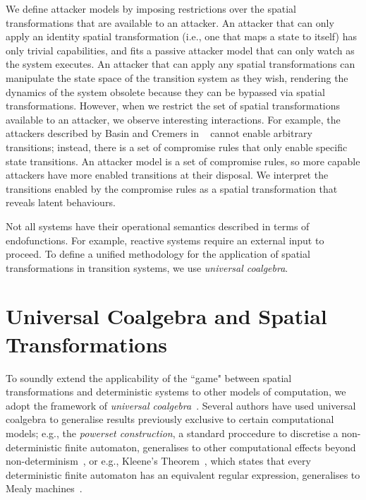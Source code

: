 We define attacker models by imposing restrictions over the spatial transformations that are available to an attacker. An attacker that can only apply an identity spatial transformation (i.e., one that maps a state to itself) has only trivial capabilities, and fits a passive attacker model that can only watch as the system executes. An attacker that can apply any spatial transformations can manipulate the state space of the transition system as they wish, rendering the dynamics of the system obsolete because they can be bypassed via spatial transformations. However, when we restrict the set of spatial transformations available to an attacker, we observe interesting interactions. For example, the attackers described by Basin and Cremers in ~\cite{KnowYourEnemy} cannot enable arbitrary transitions; instead, there is a set of
compromise rules that only enable specific state transitions. An attacker model is a set of compromise rules, so more capable attackers have more enabled transitions at their disposal. We interpret the transitions enabled by the compromise rules as a spatial transformation that reveals latent behaviours. 

Not all systems have their operational semantics described in terms of endofunctions. For example, reactive systems require an external input to proceed. To define a unified methodology for the application of spatial transformations in transition systems, we use \emph{universal coalgebra}.




\section{Universal Coalgebra and Spatial Transformations}
To soundly extend the applicability of the ``game" between spatial transformations and deterministic systems to other models of computation, we adopt the framework of \emph{universal coalgebra}~\cite{UniversalCoalgebra}.  
Several authors have used universal coalgebra to generalise results previously exclusive to certain computational models; e.g., the \emph{powerset construction}, a standard proccedure to discretise a non-deterministic finite automaton, generalises to other computational effects beyond non-determinism~\cite{GeneralisingDetermination}, or e.g., Kleene's Theorem~\cite{KleenesTheorem}, which states that every deterministic finite automaton has an equivalent regular expression, generalises to Mealy machines~\cite{KleeneCoalgebra}.  

